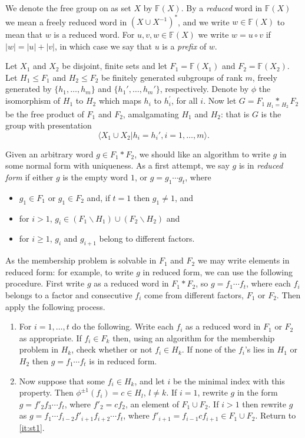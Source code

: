 \documentclass[a4paper,12pt]{article}
\numberwithin{equation}{section}
\numberwithin{figure}{section}
\newcommand{\FF}{\ensuremath{\mathbb{F}}}
\newcommand{\la}{\langle}
\newcommand{\ra}{\rangle}
\newcommand{\be}{\begin{enumerate}}
\newcommand{\ee}{\end{enumerate}}
\begin{document}
We denote the free group on as set $X$ by $\FF(X)$.
 By a {\em reduced} word in $\FF(X)$  we mean
 a freely reduced word in $(X\cup X^{-1})^\ast$, and we write $w\in \FF(X)$
to mean that $w$ is a reduced word. For $u,v, w\in \FF(X)$ we
write $w=u\circ v$ if $|w|=|u|+|v|$, in which case we say that $u$ is a {\em prefix}
of $w$.

Let $X_1$ and $X_2$ be disjoint,
finite sets and let
$F_1=\FF(X_1)$ and $F_2=\FF(X_2)$.
Let $H_1 \leq F_1$ and  $H_2 \leq F_2$ be finitely generated subgroups of rank $m$,
freely generated by $\{h_1,\ldots, h_m\}$ and  $\{h_1', \ldots, h_m'\}$, respectively.
Denote by $\phi$ the isomorphism of $H_1$ to $H_2$ which maps $h_i$ to  $h_i^\prime$,
for all $i$.
 Now let $G = F_1 \underset{H_1=H_2}{\ast} F_2$ be the free product  of $F_1$ and 
$F_2$, amalgamating $H_1$ and $H_2$: that is $G$ is the group
 with
 presentation \[\la X_1\cup X_2 | h_i = h_i', i=1, \ldots ,m\ra.\]

Given an arbitrary word $g\in F_1\ast F_2$,
we should like an algorithm to write $g$ in
some normal form with uniqueness. As a first attempt,
 we say $g$ is in \emph{reduced form} if either $g$ is the empty word $1$, or 
$g = g_1 \cdots g_t$, where
\begin{itemize}
\item
$g_1 \in F_1$ or $g_1 \in F_2$ and, if $t=1$ then $g_1\neq 1$,  and
\item
for
$i > 1$,    $g_i \in (F_1 \backslash H_1)\cup (F_2\backslash H_2)$ and
\item for $i\ge 1$,   $g_i$
and  ${g_{i+1}}$ belong to  different factors.
\end{itemize}
As the membership problem
is solvable in $F_1$ and $F_2$ we may write elements in reduced form: for example,
to write $g$ in reduced form,
we can use the following procedure.
First write $g$  as a reduced word in $F_1\ast F_2$, so $g=f_1\cdots f_t$, where
each $f_i$ belongs to a factor and
consecutive $f_i$ come from different factors, $F_1$ or $F_2$. Then apply the
following process.
\be[Step 1]
\item\label{it:st1} For $i=1,\ldots ,t$ do the following.
Write each $f_i$ as  a reduced word in $F_1$ or $F_2$ as appropriate.
If $f_i\in F_k$ then,
using an algorithm for the membership problem in $H_k$, check whether or not 
$f_i \in H_k$.
 If none of the $f_i$'s lies in $H_1$ or $H_2$ then
$g= f_1 \cdots f_t$ is in  reduced form.
\item  Now suppose that some $f_i \in H_k$,  and let  $i$ be the
minimal index with this property. Then $\phi^{\pm 1}(f_i)=c\in H_{l}$, $l\neq k$.
If $i = 1$, rewrite $g$  in the
form $g = f'_2 f_3 \cdots f_t$,  where  $f'_2 = cf_2$, an element of $F_1\cup F_2$.
If $i > 1$ then rewrite $g$ as
$g = f_1 \cdots f_{i-2} f'_{i+1}f_{i+2} \cdots f_t$, where
$f'_{i+1} = f_{i-1}c f_{i+1}\in F_1\cup F_2$. Return to
\ref{it:st1}.
\ee
\end{document}
